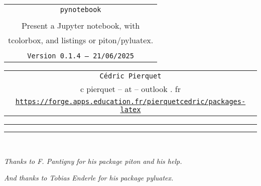 \documentclass[english,11pt,a4paper]{article}
\def\TPversion{0.1.4}
\def\TPdate{21/06/2025}
\begin{document}
\pagestyle{fancy}

\thispagestyle{empty}

\begin{center}
	\begin{minipage}{0.88\linewidth}
	\begin{tcolorbox}[colframe=yellow,colback=yellow!15]
		\begin{center}
			\begin{tabular}{c}
				{\Huge \texttt{pynotebook}}\\
				\\
				{\LARGE Present a Jupyter notebook, with} \\
				{\LARGE tcolorbox, and listings or piton/pyluatex.} \\
				\\
				{\small \texttt{Version \TPversion{} -- \TPdate}}
		\end{tabular}
		\end{center}
	\end{tcolorbox}
\end{minipage}
\end{center}

\begin{center}
	\begin{tabular}{c}
	\texttt{Cédric Pierquet}\\
	{\ttfamily c pierquet -- at -- outlook . fr}\\
	\texttt{\url{https://forge.apps.education.fr/pierquetcedric/packages-latex}}
\end{tabular}
\end{center}

\hrule


\hypertarget{matoc}{}

\tableofcontents

\vspace*{5mm}

\hrule

\vspace*{5mm}

\vfill~

\textit{\footnotesize Thanks to F. Pantigny for his package \textsf{piton} and his help.}

\textit{\footnotesize And thanks to Tobias Enderle for his package \textsf{pyluatex}.}

\pagebreak
\end{document}
